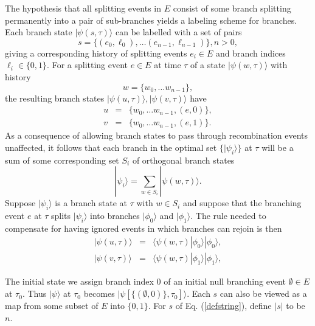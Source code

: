 \documentclass[12pt,amsmath,amssymb,onecolumn]{revtex4-2}
\begin{document}
The hypothesis that all splitting events in $E$ consist
of some branch splitting permanently into a pair of
sub-branches yields a labeling scheme for branches.
Each branch state $|\psi( s, \tau) \rangle $
can be labelled with a
set of pairs  
\begin{equation}
  \label{defstring}
  s = \{ (e_0, \ell_0),  \ldots (e_{n-1}, \ell_{n-1}) \}, n > 0,
\end{equation}  
giving a corresponding history of 
splitting events $e_i \in E$ and branch indices $ \ell_i \in \{0,1 \}$.
For a splitting event $e \in E$ at time $\tau$
of a state $|\psi(w, \tau) \rangle $ with history
\begin{equation}
      \label{defw}
      w =  \{ w_0, \ldots w_{n-1}\},
\end{equation}
the resulting branch states $|\psi(u, \tau) \rangle , |\psi(v, \tau) \rangle $
have
\begin{subequations}
  \begin{eqnarray}
    \label{defu}
    u & = & \{ w_0, \ldots w_{n-1}, (e, 0) \}, \\
    \label{defv}
    v & = & \{ w_0, \ldots w_{n-1}, (e, 1) \}.
  \end{eqnarray}
\end{subequations}
As a consequence of allowing branch states to pass through
recombination events unaffected, it follows that each
branch in the optimal set $\{ |\psi_i \rangle  \}$ at $\tau$
will be a sum of some corresponding set $S_i$ of orthogonal
branch states
\begin{equation}
  \label{truebranches}
  |\psi_i \rangle  = \sum_{w \in S_i} |\psi( w, \tau) \rangle .
\end{equation}
Suppose $|\psi_i \rangle $ is a branch state at $\tau$ with
$w \in S_i$ and suppose that the branching event $e$
at $\tau$ splits $|\psi_i \rangle $ into branches $|\phi_0 \rangle $ and $|\phi_1 \rangle $.
The rule needed to compensate for
having ignored events in which branches can rejoin
is then
\begin{subequations}
  \begin{eqnarray}
    \label{defpu}
    |\psi(u, \tau) \rangle  & = &  \langle  \psi( w, \tau) | \phi_0 \rangle  |\phi_0 \rangle , \\
    \label{defpv}
    |\psi(v, \tau) \rangle  & = &  \langle  \psi( w, \tau) | \phi_1 \rangle  |\phi_1 \rangle , 
  \end{eqnarray}
\end{subequations}


The initial state
we assign branch index 0
of an initial null branching event
$ \emptyset \in E$ at $\tau_0$.
Thus $|\psi \rangle $ at $\tau_0$ becomes
$|\psi[\{( \emptyset, 0)\}, \tau_0] \rangle $.
Each $s$ can also be viewed as a map from
some subset of $E$ into $\{0,1\}$.
For $s$ of Eq. (\ref{defstring}),
define $|s|$ to be $n$. 
\end{document}
